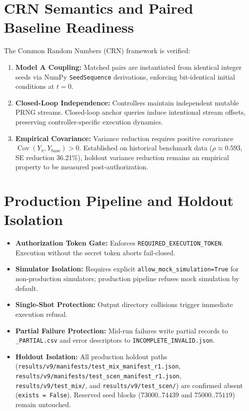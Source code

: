 \documentclass[10pt,a4paper]{article}
\begin{document}
\section{CRN Semantics and Paired Baseline Readiness}
The Common Random Numbers (CRN) framework is verified:
\begin{enumerate}
    \item \textbf{Model A Coupling:} Matched pairs are instantiated from identical integer seeds via NumPy \texttt{SeedSequence} derivations, enforcing bit-identical initial conditions at $t=0$.
    \item \textbf{Closed-Loop Independence:} Controllers maintain independent mutable PRNG streams. Closed-loop anchor queries induce intentional stream offsets, preserving controller-specific execution dynamics.
    \item \textbf{Empirical Covariance:} Variance reduction requires positive covariance $\operatorname{Cov}(Y_\pi, Y_{\text{base}}) > 0$. Established on historical benchmark data ($\rho \approx 0.593$, SE reduction 36.21\%), holdout variance reduction remains an empirical property to be measured post-authorization.
\end{enumerate}

\section{Production Pipeline and Holdout Isolation}
\begin{itemize}
    \item \textbf{Authorization Token Gate:} Enforces \texttt{REQUIRED\_EXECUTION\_TOKEN}. Execution without the secret token aborts fail-closed.
    \item \textbf{Simulator Isolation:} Requires explicit \texttt{allow\_mock\_simulation=True} for non-production simulators; production pipeline refuses mock simulation by default.
    \item \textbf{Single-Shot Protection:} Output directory collisions trigger immediate execution refusal.
    \item \textbf{Partial Failure Protection:} Mid-run failures write partial records to \texttt{\_PARTIAL.csv} and error descriptors to \texttt{INCOMPLETE\_INVALID.json}.
    \item \textbf{Holdout Isolation:} All production holdout paths (\texttt{results/v9/manifests/test\_mix\_manifest\_r1.json}, \texttt{results/v9/manifests/test\_scen\_manifest\_r1.json}, \texttt{results/v9/test\_mix/}, and \texttt{results/v9/test\_scen/}) are confirmed absent (\texttt{exists = False}). Reserved seed blocks ($73000..74439$ and $75000..75119$) remain untouched.
\end{itemize}
\end{document}
